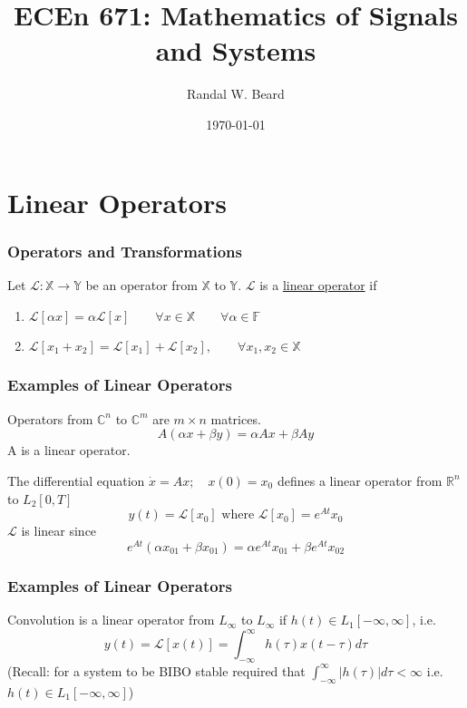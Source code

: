 \documentclass{beamer}
\title{ECEn 671: Mathematics of Signals and Systems}
\author{Randal W. Beard}
\institute{Brigham Young University}
\date{\today}
\begin{document}
\begin{frame}
	\titlepage
\end{frame}



\section{Linear Operators}
\frame{\sectionpage}

\begin{frame}\frametitle{Operators and Transformations}
\begin{definition}	
	Let $\mathcal{L}:\mathbb{X}\to\mathbb{Y}$ be an operator from $\mathbb{X}$ to
$\mathbb{Y}$.  $\mathcal{L}$ is a \underline{linear operator} if
\begin{enumerate}
  \item $\mathcal{L}[\alpha x] = \alpha \mathcal{L}[x] \qquad \forall x \in \mathbb{X} \qquad \forall \alpha \in \mathbb{F}$
  \item $\mathcal{L}[x_1 + x_2] = \mathcal{L}[x_1] + \mathcal{L}[x_2], \qquad \forall x_1, x_2\in\mathbb{X}$
\end{enumerate}
\end{definition}

\end{frame}

\begin{frame}\frametitle{Examples of Linear Operators}
\begin{example}[Matrices]	
Operators from $\mathbb{C}^n$ to $\mathbb{C}^m$ are $m \times n$ matrices.
\[ A(\alpha x + \beta y) = \alpha Ax + \beta Ay \] 
A is a linear operator.
\end{example}

\begin{example}
The differential equation $\dot{x} = Ax; \quad x(0) = x_0$
defines a linear operator from $\mathbb{R}^n$ to $L_2[0,T]$
\[
y(t) = \mathcal{L}[x_0] \text{ where } \mathcal{L}[x_0] = e^{At}x_0 
\]
\indent $\mathcal{L}$ is linear since 
\[ 
e^{At}(\alpha x_{01} + \beta  x_{01}) = \alpha e^{At}x_{01} + \beta e^{At}x_{02} 
\]
\end{example}


\end{frame}

\begin{frame}\frametitle{Examples of Linear Operators}
\begin{example}[Convolution]
Convolution is a linear operator from $L_{\infty}$ to
$L_{\infty}$ if $h(t) \in L_1[-\infty,\infty]$, i.e.
\[ y(t) = \mathcal{L}[x(t)] = \int_{-\infty}^{\infty} h(\tau)x(t - \tau)
d\tau \] 
\indent (Recall: for a system to be BIBO stable required
that $\int_{-\infty}^{\infty}|h(\tau)|d\tau <\infty$
\indent i.e. $h(t) \in L_1[-\infty,\infty]$)
\end{example}
\end{frame}
\end{document}
